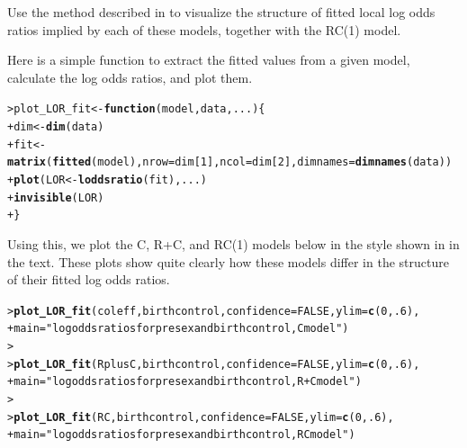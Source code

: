 \documentclass[10pt]{report}\usepackage[]{graphicx}\usepackage[]{color}
\makeatletter
\newcommand{\hlnum}[1]{\textcolor[rgb]{0.686,0.059,0.569}{#1}}%
\newcommand{\hlstr}[1]{\textcolor[rgb]{0.192,0.494,0.8}{#1}}%
\newcommand{\hlstd}[1]{\textcolor[rgb]{0.345,0.345,0.345}{#1}}%
\newcommand{\hlkwa}[1]{\textcolor[rgb]{0.161,0.373,0.58}{\textbf{#1}}}%
\newcommand{\hlkwb}[1]{\textcolor[rgb]{0.69,0.353,0.396}{#1}}%
\newcommand{\hlkwc}[1]{\textcolor[rgb]{0.333,0.667,0.333}{#1}}%
\newcommand{\hlkwd}[1]{\textcolor[rgb]{0.737,0.353,0.396}{\textbf{#1}}}%
\newenvironment{kframe}{%
 \def\at@end@of@kframe{}%
 \ifinner\ifhmode%
  \def\at@end@of@kframe{\end{minipage}}%
  \begin{minipage}{\columnwidth}%
 \fi\fi%
 \def\FrameCommand##1{\hskip\@totalleftmargin \hskip-\fboxsep
 \colorbox{shadecolor}{##1}\hskip-\fboxsep
     \hskip-\linewidth \hskip-\@totalleftmargin \hskip\columnwidth}%
 \MakeFramed {\advance\hsize-\width
   \@totalleftmargin\z@ \linewidth\hsize
   \@setminipage}}%
 {\par\unskip\endMakeFramed%
 \at@end@of@kframe}
\newenvironment{knitrout}{}{} %
\renewenvironment{knitrout}{\small\renewcommand{\baselinestretch}{.85}}{} %
\makeatother
\begin{document}
\begin{Exercises}
\begin{enumerate*}
    \item Use the method described in 
          to visualize the structure of fitted local log odds ratios implied by each of 
          these models, together with the RC(1) model. 
    \begin{ans}
    Here is a simple function to extract the fitted values from a given model, calculate the
    log odds ratios, and plot them.
\begin{knitrout}\footnotesize
{}\color{fgcolor}\begin{kframe}
\begin{alltt}
\hlstd{> }\hlstd{plot_LOR_fit} \hlkwb{<-} \hlkwa{function}\hlstd{(}\hlkwc{model}\hlstd{,} \hlkwc{data}\hlstd{,} \hlkwc{...}\hlstd{) \{}
\hlstd{+ }        \hlstd{dim} \hlkwb{<-} \hlkwd{dim}\hlstd{(data)}
\hlstd{+ }        \hlstd{fit} \hlkwb{<-} \hlkwd{matrix}\hlstd{(}\hlkwd{fitted}\hlstd{(model),} \hlkwc{nrow}\hlstd{=dim[}\hlnum{1}\hlstd{],} \hlkwc{ncol}\hlstd{=dim[}\hlnum{2}\hlstd{],} \hlkwc{dimnames}\hlstd{=}\hlkwd{dimnames}\hlstd{(data))}
\hlstd{+ }        \hlkwd{plot}\hlstd{(LOR} \hlkwb{<-} \hlkwd{loddsratio}\hlstd{(fit), ...)}
\hlstd{+ }        \hlkwd{invisible}\hlstd{(LOR)}
\hlstd{+ }\hlstd{\}}
\end{alltt}
\end{kframe}
\end{knitrout}
    Using this, we plot the C, R+C, and RC(1) models below in the style shown in 
    in the text.  These plots show quite clearly how these models differ in the structure of their
    fitted log odds ratios.
\begin{knitrout}\footnotesize
{}\color{fgcolor}\begin{kframe}
\begin{alltt}
\hlstd{> }\hlkwd{plot_LOR_fit}\hlstd{(coleff, birthcontrol,} \hlkwc{confidence}\hlstd{=}\hlnum{FALSE}\hlstd{,} \hlkwc{ylim}\hlstd{=}\hlkwd{c}\hlstd{(}\hlnum{0}\hlstd{,} \hlnum{.6}\hlstd{),}
\hlstd{+ }        \hlkwc{main}\hlstd{=}\hlstr{"log odds ratios for presex and birthcontrol, C model"}\hlstd{)}
\hlstd{> }
\hlstd{> }\hlkwd{plot_LOR_fit}\hlstd{(RplusC, birthcontrol,} \hlkwc{confidence}\hlstd{=}\hlnum{FALSE}\hlstd{,} \hlkwc{ylim}\hlstd{=}\hlkwd{c}\hlstd{(}\hlnum{0}\hlstd{,} \hlnum{.6}\hlstd{),}
\hlstd{+ }        \hlkwc{main}\hlstd{=}\hlstr{"log odds ratios for presex and birthcontrol, R+C model"}\hlstd{)}
\hlstd{> }
\hlstd{> }\hlkwd{plot_LOR_fit}\hlstd{(RC, birthcontrol,} \hlkwc{confidence}\hlstd{=}\hlnum{FALSE}\hlstd{,} \hlkwc{ylim}\hlstd{=}\hlkwd{c}\hlstd{(}\hlnum{0}\hlstd{,} \hlnum{.6}\hlstd{),}
\hlstd{+ }        \hlkwc{main}\hlstd{=}\hlstr{"log odds ratios for presex and birthcontrol, RC model"}\hlstd{)}
\end{alltt}
\end{kframe}


\end{knitrout}
\end{ans}
\end{enumerate*}
\end{Exercises}
\end{document}
